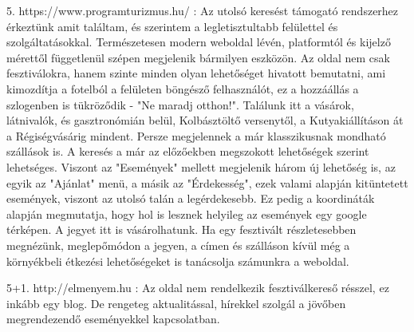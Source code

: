 \documentclass[11pt]{article}
\begin{document}
5. https://www.programturizmus.hu/ : Az utolsó keresést támogató rendszerhez érkeztünk amit találtam, és szerintem a legletisztultabb felülettel és szolgáltatásokkal. Természetesen modern weboldal lévén, platformtól és kijelző mérettől függetlenül szépen megjelenik bármilyen eszközön. Az oldal nem csak fesztiválokra, hanem szinte minden olyan lehetőséget hivatott bemutatni, ami kimozdítja a fotelból a felületen böngésző felhasználót, ez a hozzáállás a szlogenben is tükröződik - "Ne maradj otthon!". Találunk itt a vásárok, látnivalók, és gasztronómián belül, Kolbásztöltő versenytől, a Kutyakiállításon át a Régiségvásárig mindent. Persze megjelennek a már klasszikusnak mondható szállások is. A keresés a már az előzőekben megszokott lehetőségek szerint lehetséges. Viszont az "Események" mellett megjelenik három új lehetőség is, az egyik az "Ajánlat" menü, a másik az "Érdekesség", ezek valami alapján kitüntetett események, viszont az utolsó talán a legérdekesebb. Ez pedig a koordináták alapján megmutatja, hogy hol is lesznek helyileg az események egy google térképen. A jegyet itt is vásárolhatunk. Ha egy fesztivált részletesebben megnézünk, meglepőmódon a jegyen, a címen és szálláson kívül még a környékbeli étkezési lehetőségeket is tanácsolja számunkra a weboldal.

5+1. http://elmenyem.hu : Az oldal nem rendelkezik fesztiválkereső résszel, ez inkább egy blog. De rengeteg aktualitással, hírekkel szolgál a jövőben megrendezendő eseményekkel kapcsolatban. 

\end{document}
